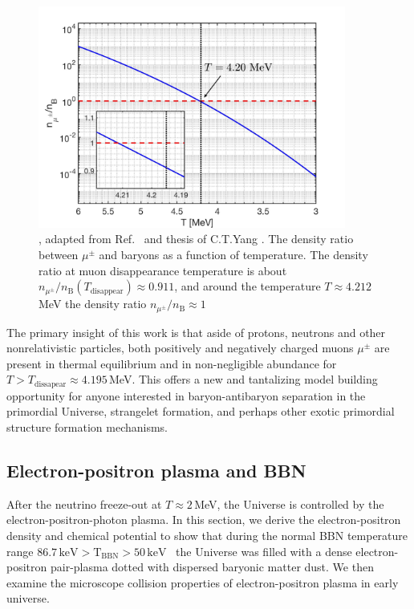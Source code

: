 \begin{figure}
\centerline{\includegraphics[width=0.9\textwidth]{./plots/DensityRatio_new2.jpg}}
\caption{, adapted from Ref.~\cite{Rafelski:2021aey} and thesis of C.T.Yang \cite{Yang:2024ret}.
The density ratio between $\mu^\pm$ and baryons as a function of temperature. The density ratio at muon disappearance temperature is about $n_{\mu^\pm}/n_\mathrm{B}(T_\mathrm{disappear})\approx0.911$, and around the temperature $T\approx4.212$ MeV the density ratio $n_{\mu^\pm}/n_\mathrm{B}\approx1$}
\label{fig:DensityRatio}
\end{figure}

The primary insight of this work is that aside of protons, neutrons and other nonrelativistic particles, both positively and negatively charged muons $\mu^\pm$ are present in thermal equilibrium and in non-negligible abundance for $T>T_\mathrm{dissapear}\approx 4.195$\,MeV. This offers a new and tantalizing model building opportunity for anyone interested in baryon-antibaryon separation in the primordial Universe, strangelet formation, and perhaps other exotic primordial structure formation mechanisms.






\subsection{Electron-positron plasma and BBN}
\label{section_electron}
After the neutrino freeze-out at $T\approx 2$\,MeV, the Universe is controlled by the electron-positron-photon plasma. In this section, we
derive the electron-positron density and chemical potential to show that during the normal BBN temperature range $86.7\,\mathrm{keV}>\mathrm{T_{BBN}}>50\,\mathrm{keV}$~\cite{Pitrou:2018cgg} the Universe was filled with a dense electron-positron pair-plasma dotted with dispersed baryonic matter dust. We then examine the microscope collision properties of electron-positron plasma in early universe.

